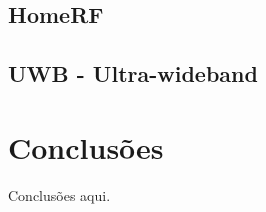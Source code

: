 \documentclass[conference]{IEEEtran}
\begin{document}
\subsection{HomeRF}

\subsection{UWB - Ultra-wideband}


\section{Conclusões}
Conclusões aqui.

{}

\end{document}
